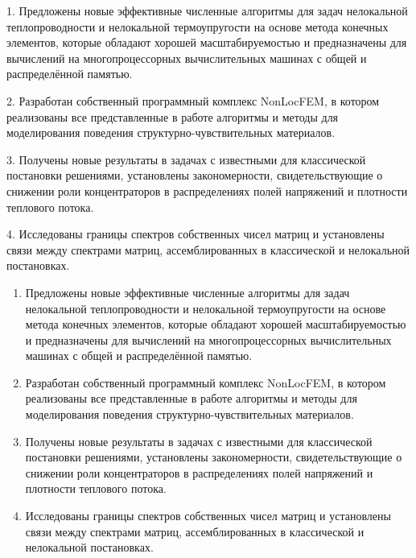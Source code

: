 {\novelty}
\ifsynopsis

1. Предложены новые эффективные численные алгоритмы для задач нелокальной теплопроводности и нелокальной термоупругости на основе метода конечных элементов, которые обладают хорошей масштабируемостью и предназначены для вычислений на многопроцессорных вычислительных машинах с общей и распределённой памятью.

2. Разработан собственный программный комплекс NonLocFEM, в котором реализованы все представленные в работе алгоритмы и методы для моделирования поведения структурно-чувствительных материалов.

3. Получены новые результаты в задачах с известными для классической постановки решениями, установлены закономерности, свидетельствующие о снижении роли концентраторов в распределениях полей напряжений и плотности теплового потока.

4. Исследованы границы спектров собственных чисел матриц и установлены связи между спектрами матриц, ассемблированных в классической и нелокальной постановках.
\else
\begin{enumerate}[beginpenalty=10000] %
  \item Предложены новые эффективные численные алгоритмы для задач нелокальной теплопроводности и нелокальной термоупругости на основе метода конечных элементов, которые обладают хорошей масштабируемостью и предназначены для вычислений на многопроцессорных вычислительных машинах с общей и распределённой памятью.
  \item Разработан собственный программный комплекс NonLocFEM, в котором реализованы все представленные в работе алгоритмы и методы для моделирования поведения структурно-чувствительных материалов.
  \item Получены новые результаты в задачах с известными для классической постановки решениями, установлены закономерности, свидетельствующие о снижении роли концентраторов в распределениях полей напряжений и плотности теплового потока.
  \item Исследованы границы спектров собственных чисел матриц и установлены связи между спектрами матриц, ассемблированных в классической и нелокальной постановках.
\end{enumerate}
\fi

